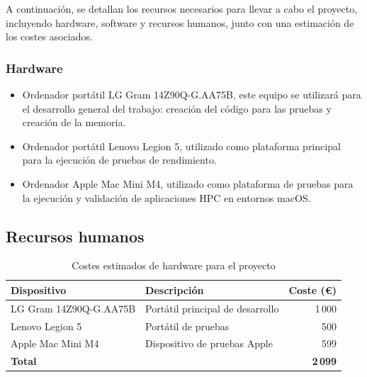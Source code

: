 A continuación, se detallan los recursos necesarios para llevar a cabo el proyecto, incluyendo hardware, software y recursos humanos, junto con una estimación de los costes asociados.

\subsubsection{Hardware}

\begin{itemize}[noitemsep]
      \item Ordenador portátil LG Gram 14Z90Q-G.AA75B, este equipo se utilizará para el desarrollo general del trabajo: creación del código para las pruebas y creación de la memoria.

      \item Ordenador portátil Lenovo Legion 5, utilizado como plataforma principal para la ejecución de pruebas de rendimiento.

      \item Ordenador Apple Mac Mini M4, utilizado como plataforma de pruebas para la ejecución y validación de aplicaciones HPC en entornos macOS.
\end{itemize}

\subsection{Recursos humanos}

\begin{table}[!ht]
      \centering
      \begin{tabular}{|l|l|r|}
            \hline
            \textbf{Dispositivo}   & \textbf{Descripción}             & \textbf{Coste (€)} \\
            \hline
            LG Gram 14Z90Q-G.AA75B & Portátil principal de desarrollo & 1\,000             \\
            Lenovo Legion 5        & Portátil de pruebas              & 500                \\
            Apple Mac Mini M4      & Dispositivo de pruebas Apple     & 599                \\
            \hline
            \textbf{Total}         &                                  & \textbf{2\,099}    \\
            \hline
      \end{tabular}
      \caption{Costes estimados de hardware para el proyecto}
      \label{tab:costes-hardware}
\end{table}

